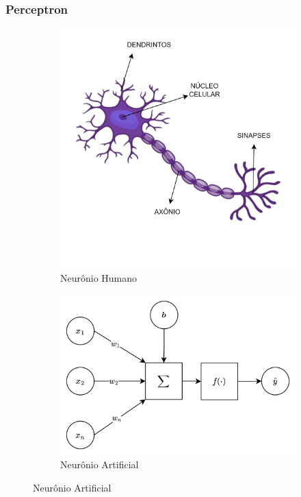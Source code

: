 \documentclass{beamer}
\begin{document}
\begin{frame}
	\frametitle{Perceptron}
	\begin{figure}
		\centering
		\begin{subfigure}{.45\textwidth}
			\includegraphics[width=1\linewidth]{figures/neuron}
			\caption{Neurônio Humano}
		\end{subfigure}
		\begin{subfigure}{.45\textwidth}
			\includegraphics[width=1\linewidth]{figures/neuron_ai}
			\caption{Neurônio Artificial}
		\end{subfigure}
	\end{figure}
\end{frame}
\end{document}
